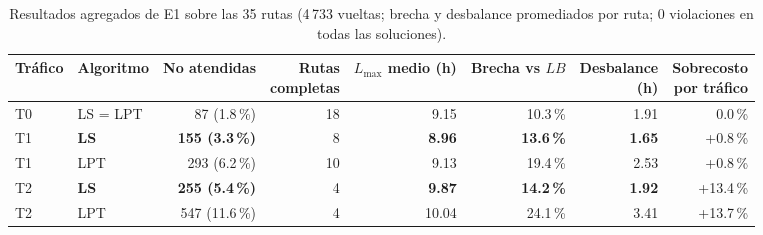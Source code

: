 \begin{table}[H]
\centering\small
\caption{Resultados agregados de E1 sobre las 35 rutas (4\,733 vueltas; brecha y desbalance promediados por ruta; 0 violaciones en todas las soluciones).}
\label{tab:e1}
\begin{tabular}{llrrrrrr}
\toprule
Tráfico & Algoritmo & No atendidas & \makecell{Rutas\\completas} & \makecell{$L_{\max}$\\medio (h)} & \makecell{Brecha\\vs $LB$} & \makecell{Desbalance\\(h)} & \makecell{Sobrecosto\\por tráfico} \\
\midrule
T0 & LS = LPT & 87 (1.8\,\%) & 18 & 9.15 & 10.3\,\% & 1.91 & 0.0\,\% \\
\midrule
T1 & \textbf{LS} & \textbf{155 (3.3\,\%)} & 8 & \textbf{8.96} & \textbf{13.6\,\%} & \textbf{1.65} & +0.8\,\% \\
T1 & LPT & 293 (6.2\,\%) & 10 & 9.13 & 19.4\,\% & 2.53 & +0.8\,\% \\
\midrule
T2 & \textbf{LS} & \textbf{255 (5.4\,\%)} & 4 & \textbf{9.87} & \textbf{14.2\,\%} & \textbf{1.92} & +13.4\,\% \\
T2 & LPT & 547 (11.6\,\%) & 4 & 10.04 & 24.1\,\% & 3.41 & +13.7\,\% \\
\bottomrule
\end{tabular}
\end{table}
